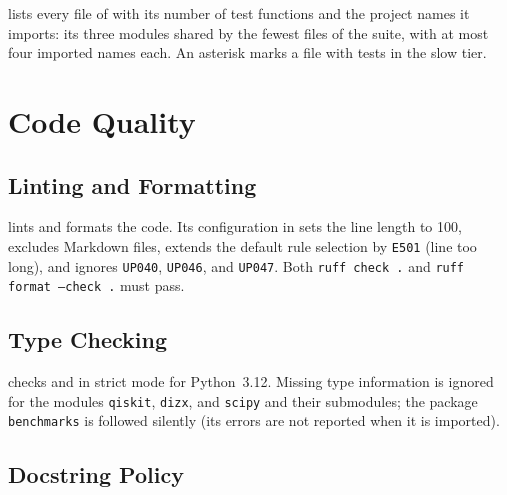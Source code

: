  lists every file of  with its number of test functions and the project names it imports: its three modules shared by the fewest files of the suite, with at most four imported names each. An asterisk marks a file with tests in the slow tier.

{\small

}

\section{Code Quality}\label{sec:dev-quality}

\subsection{Linting and Formatting}\label{sec:dev-ruff}

 lints and formats the code. Its configuration in  sets the line length to 100, excludes Markdown files, extends the default rule selection by \texttt{E501} (line too long), and ignores \texttt{UP040}, \texttt{UP046}, and \texttt{UP047}. Both \texttt{ruff check .} and \texttt{ruff format --check .} must pass.

\subsection{Type Checking}\label{sec:dev-mypy}

 checks  and  in strict mode for Python~3.12. Missing type information is ignored for the modules \texttt{qiskit}, \texttt{dizx}, and \texttt{scipy} and their submodules; the package \texttt{benchmarks} is followed silently (its errors are not reported when it is imported).

\subsection{Docstring Policy}\label{sec:dev-docstrings}

